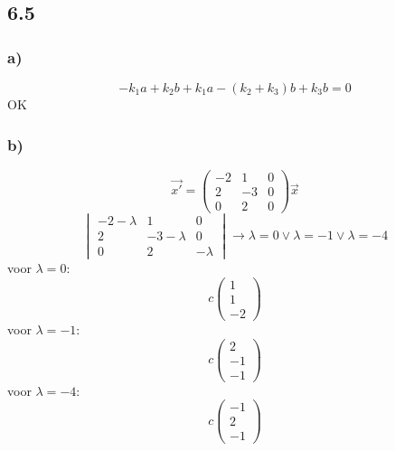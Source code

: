 \documentclass[11pt]{article}
\begin{document}
\subsection*{6.5}
\subsubsection*{a)}
\[
-k_1a+k_2b+k_1a-(k_2+k_3)b+k_3b=0
\]
OK
\subsubsection*{b)}
\[
\vec{x'}=
\begin{pmatrix}
-2 & 1 & 0\\
2 & -3 & 0\\
0 & 2 & 0
\end{pmatrix}
\vec{x}
\]
\[
\begin{vmatrix}
-2-\lambda & 1 & 0\\
2 & -3-\lambda & 0\\
0 & 2 & -\lambda
\end{vmatrix}
\longrightarrow
\lambda=0 \vee \lambda=-1 \vee \lambda=-4
\]
voor $\lambda=0$:
\[
c
\begin{pmatrix}
1\\1\\-2
\end{pmatrix}
\]
voor $\lambda=-1$:
\[
c
\begin{pmatrix}
2\\-1\\-1
\end{pmatrix}
\]
voor $\lambda=-4$:
\[
c
\begin{pmatrix}
-1\\2\\-1
\end{pmatrix}
\]
\end{document}
